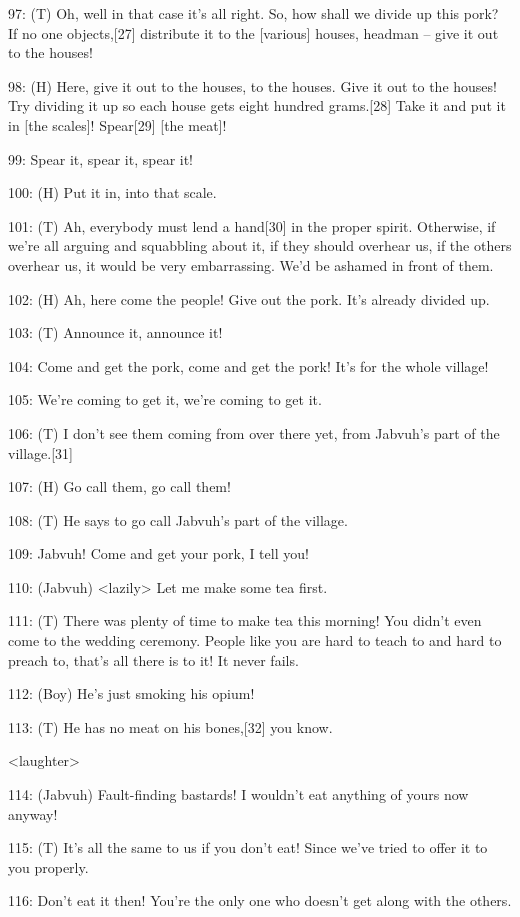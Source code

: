 {97: (T) Oh, well in that case it's all right. So, how shall we divide up
this pork? If no one objects,[27] distribute it to the [various] houses, headman
-- give it out to the houses!}

{98: (H) Here, give it out to the houses, to the houses. Give it out to
the houses! Try dividing it up so each house gets eight hundred grams.[28] Take
it and put it in [the scales]! Spear[29] [the meat]!}

{99: Spear it, spear it, spear it! }

{100: (H) Put it in, into that scale.}

{101: (T) Ah, everybody must lend a hand[30] in the proper spirit. Otherwise,
if we're all arguing and squabbling about it, if they should overhear us, if the
others overhear us, it would be very embarrassing. We'd be ashamed in front of
them.}

{102: (H) Ah, here come the people! Give out the pork. It's already divided
up. }

{103: (T) Announce it, announce it! }

{104: Come and get the pork, come and get the pork! It's for the whole village!}

{105: We're coming to get it, we're coming to get it.}

{106: (T) I don't see them coming from over there yet, from Jabvuh's part
of the village.[31] }

{107: (H) Go call them, go call them!}

{108: (T) He says to go call Jabvuh's part of the village. }

{109: Jabvuh! Come and get your pork, I tell you!}

{110: (Jabvuh) <lazily> Let me make some tea first.}

{111: (T) There was plenty of time to make tea this morning! You didn't
even come to the wedding ceremony. People like you are hard to teach to and hard
to preach to, that's all there is to it! It never fails. }

{112: (Boy) He's just smoking his opium!}

{113: (T) He has no meat on his bones,[32] you know.}

{<laughter>}

{114: (Jabvuh) Fault-finding bastards! I wouldn't eat anything of yours
now anyway!}

{115: (T) It's all the same to us if you don't eat! Since we've tried to
offer it to you properly.}

{116: Don't eat it then! You're the only one who doesn't get along with
the others.}

